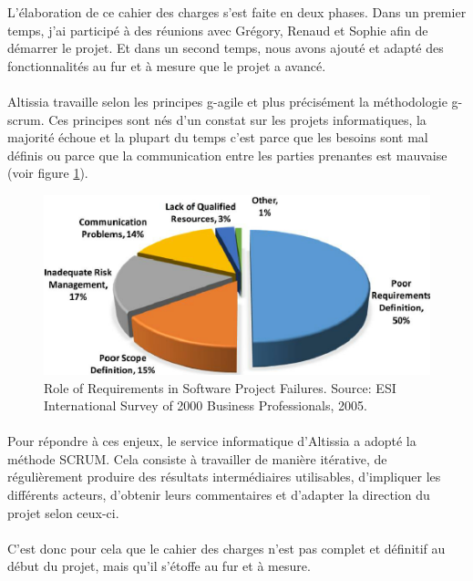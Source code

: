 L'élaboration de ce cahier des charges s'est faite en deux phases. 
Dans un premier temps, j'ai participé à des réunions avec Grégory, Renaud et Sophie afin de démarrer le projet. 
Et dans un second temps, nous avons ajouté et adapté des fonctionnalités au fur et à mesure que le projet a avancé.

\paragraph{}
Altissia travaille selon les principes \gls{g-agile} et plus précisément la méthodologie \Gls{g-scrum}.
Ces principes sont nés d'un constat sur les projets informatiques, la majorité échoue\cite{standish_standish_nodate} et la plupart du temps c'est parce que les besoins sont mal définis ou parce que la communication entre les parties prenantes est mauvaise (voir figure \ref{fig:why-projects-fails}).

\begin{figure}[ht]
    \centering
    \includegraphics[scale=.8]{images/why-projects-fail.png}
    \caption{Role of Requirements in Software Project Failures. Source: ESI International Survey of 2000 Business Professionals, 2005.}
    \label{fig:why-projects-fails}
\end{figure}

\paragraph{}
Pour répondre à ces enjeux, le service informatique d'Altissia a adopté la méthode SCRUM.
Cela consiste à travailler de manière itérative, de régulièrement produire des résultats intermédiaires utilisables, d'impliquer les différents acteurs, d'obtenir leurs commentaires et d'adapter la direction du projet selon ceux-ci.

\paragraph{}
C'est donc pour cela que le cahier des charges n'est pas complet et définitif au début du projet, mais qu'il s'étoffe au fur et à mesure.
